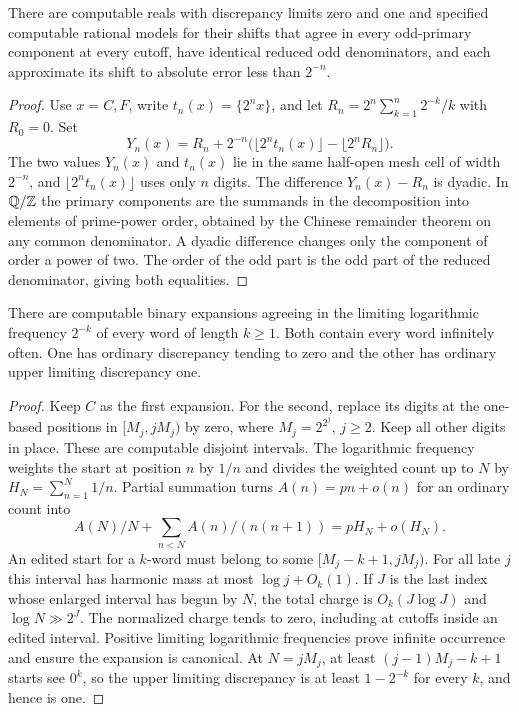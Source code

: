 \documentclass[11pt]{article}
\begin{document}
\begin{proposition}\label{prop:odd}
There are computable reals with discrepancy limits zero and one and specified computable rational models for their shifts that agree in every odd-primary component at every cutoff, have identical reduced odd denominators, and each approximate its shift to absolute error less than \(2^{-n}\).
\end{proposition}
\begin{proof}
Use \(x=C,F\), write \(t_n(x)=\{2^nx\}\), and let \(R_n=2^n\sum_{k=1}^n 2^{-k}/k\) with \(R_0=0\). Set
\[
 Y_n(x)=R_n+2^{-n}\big(\lfloor2^nt_n(x)\rfloor-\lfloor2^nR_n\rfloor\big).
\]
The two values \(Y_n(x)\) and \(t_n(x)\) lie in the same half-open mesh cell of width \(2^{-n}\), and \(\lfloor2^nt_n(x)\rfloor\) uses only \(n\) digits. The difference \(Y_n(x)-R_n\) is dyadic. In \(\mathbb Q/\mathbb Z\) the primary components are the summands in the decomposition into elements of prime-power order, obtained by the Chinese remainder theorem on any common denominator. A dyadic difference changes only the component of order a power of two. The order of the odd part is the odd part of the reduced denominator, giving both equalities.
\end{proof}

\begin{proposition}\label{prop:log}
There are computable binary expansions agreeing in the limiting logarithmic frequency \(2^{-k}\) of every word of length \(k\ge1\). Both contain every word infinitely often. One has ordinary discrepancy tending to zero and the other has ordinary upper limiting discrepancy one.
\end{proposition}
\begin{proof}
Keep \(C\) as the first expansion. For the second, replace its digits at the one-based positions in \([M_j,jM_j)\) by zero, where \(M_j=2^{2^j}\), \(j\ge2\). Keep all other digits in place. These are computable disjoint intervals. The logarithmic frequency weights the start at position \(n\) by \(1/n\) and divides the weighted count up to \(N\) by \(H_N=\sum_{n=1}^N1/n\). Partial summation turns \(A(n)=pn+o(n)\) for an ordinary count into
\[
 A(N)/N+\sum_{n<N} A(n)/(n(n+1))=pH_N+o(H_N).
\]
An edited start for a \(k\)-word must belong to some \([M_j-k+1,jM_j)\). For all late \(j\) this interval has harmonic mass at most \(\log j+O_k(1)\). If \(J\) is the last index whose enlarged interval has begun by \(N\), the total charge is \(O_k(J\log J)\) and \(\log N\gg 2^J\). The normalized charge tends to zero, including at cutoffs inside an edited interval. Positive limiting logarithmic frequencies prove infinite occurrence and ensure the expansion is canonical. At \(N=jM_j\), at least \((j-1)M_j-k+1\) starts see \(0^k\), so the upper limiting discrepancy is at least \(1-2^{-k}\) for every \(k\), and hence is one.
\end{proof}
\end{document}

